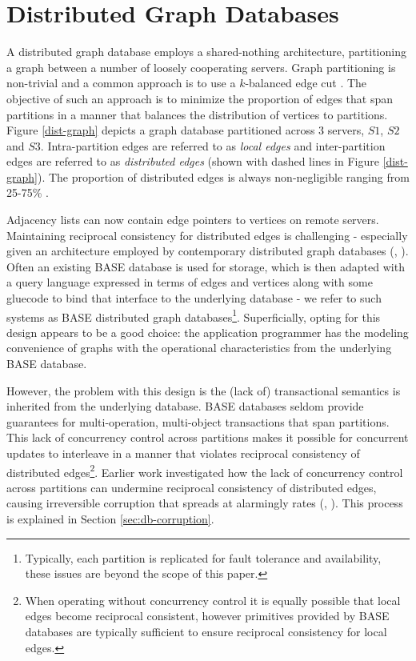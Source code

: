 \section{Distributed Graph Databases}
\label{sec:distr-graph-datab}

A distributed graph database employs a shared-nothing architecture, partitioning a graph between a number of loosely cooperating servers.
Graph partitioning is non-trivial and a common approach is to use a $k$-balanced edge cut \cite{Huang2016}.
The objective of such an approach is to minimize the proportion of edges that span partitions in a manner that balances the distribution of vertices to partitions.
Figure \ref{dist-graph} depicts a graph database partitioned across 3 servers, $S1$, $S2$ and $S3$.
Intra-partition edges are referred to as \textit{local edges} and inter-partition edges are referred to as \textit{distributed edges} (shown with dashed lines in Figure \ref{dist-graph}).
The proportion of distributed edges is always non-negligible ranging from 25-75\% \cite{Huang2016}.



Adjacency lists can now contain edge pointers to vertices on remote servers. Maintaining reciprocal consistency for distributed edges is challenging - especially given an architecture employed by contemporary distributed graph databases (\cite{janusgraph}, \cite{TitanDB}). Often an existing BASE database is used for storage, which is then adapted with a query language expressed in terms of edges and vertices along with some gluecode to bind that interface to the underlying database - we refer to such systems as BASE distributed graph databases\footnote{Typically, each partition is replicated for fault tolerance and availability, these issues are beyond the scope of this paper.}. Superficially, opting for this design appears to be a good choice: the application programmer has the modeling convenience of graphs with the operational characteristics from the underlying BASE database.

However, the problem with this design is the (lack of) transactional semantics is inherited from the underlying database. BASE databases seldom provide guarantees for multi-operation, multi-object transactions that span partitions. This lack of concurrency control across partitions makes it possible for concurrent updates to interleave in a manner that violates reciprocal consistency of distributed edges\footnote{When operating without concurrency control it is equally possible that local edges become reciprocal consistent, however primitives provided by BASE databases are typically sufficient to ensure reciprocal consistency for local edges.}. Earlier work investigated how the lack of concurrency control across partitions can undermine reciprocal consistency of distributed edges, causing irreversible corruption that spreads at alarmingly rates (\cite{Ezhilchelvan2018}, \cite{Webber2019}). This process is explained in Section \ref{sec:db-corruption}.




